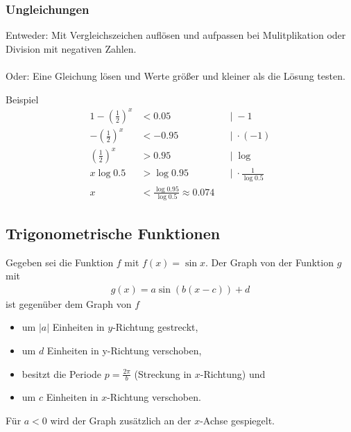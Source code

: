 \documentclass{article}
\begin{document}
\subsubsection*{Ungleichungen}
Entweder: Mit Vergleichszeichen auflösen und aufpassen bei
Mulitplikation oder Division mit negativen Zahlen.
\\\\
Oder: Eine Gleichung lösen und Werte größer und kleiner als
die Lösung testen.
\begin{boxx}[DarkBlue]{Beispiel}
    \begin{align*}
        1 - \left(\frac{1}{2}\right)^x &< 0.05 & &|\; - 1 \\
        - \left(\frac{1}{2}\right)^x &< -0.95 & &|\; \cdot (-1) \\
        \left(\frac{1}{2}\right)^x &> 0.95 & &|\; \log \\
        x \log 0.5 &> \log 0.95 & &|\; \cdot \frac{1}{\log 0.5} \\
        x &< \frac{\log 0.95}{\log 0.5} \approx 0.074
    \end{align*}
\end{boxx}

\subsection{Trigonometrische Funktionen}

Gegeben sei die Funktion $f$ mit $f(x) = \sin x$.
Der Graph von der Funktion $g$ mit
\begin{align*}
    g(x) = a \sin\left(b(x-c)\right) + d
\end{align*}
ist gegenüber dem Graph von $f$
\begin{itemize}
    \item um $|a|$ Einheiten in $y$-Richtung gestreckt,
    \item um $d$ Einheiten in y-Richtung verschoben,
    \item besitzt die Periode 
    $\displaystyle p = \frac{2 \pi}{b}$ 
    (Streckung in $x$-Richtung) und
    \item um $c$ Einheiten in $x$-Richtung verschoben.
\end{itemize}

Für $a<0$ wird der Graph zusätzlich an der $x$-Achse
gespiegelt.
\end{document}
